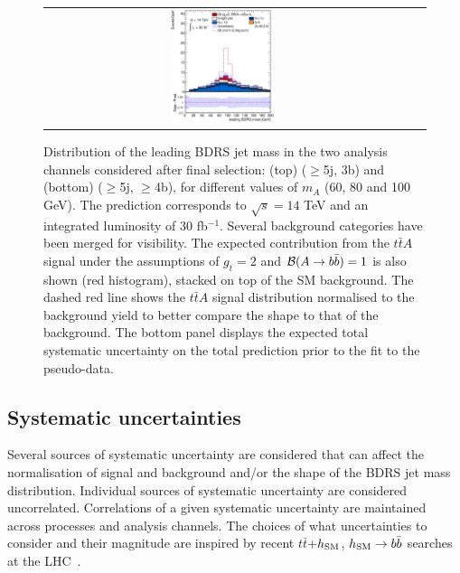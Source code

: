 \documentclass[preprintnumbers,superscriptaddress,nofootinbib,aps,prd,floatfix]{revtex4}
\newcommand{\ttbar}{\ensuremath{t\bar{t}}}
\begin{document}
\begin{figure}[htbp]
\begin{center}
\begin{tabular}{ccc}
\includegraphics[width=0.3\textwidth]{Figures/21stJuly/tta100/VD_2.eps} \\
\end{tabular}
\caption{\small {Distribution of the leading BDRS jet mass in the two analysis channels considered after final selection: 
(top) ($\geq$5j, 3b) and (bottom) ($\geq$5j, $\geq$4b), for different values of $m_A$ (60, 80 and 100 GeV).
The prediction corresponds to $\sqrt{s}=14$ TeV and an integrated luminosity of 30 fb$^{-1}$.
Several background categories have been merged for visibility. The expected contribution from 
the $\ttbar A$ signal under the assumptions of $g_t=2$ and ${\cal B}(A\to b\bar{b})=1$  is also shown
(red histogram), stacked on top of the SM background. The dashed red line shows the $\ttbar A$  signal 
distribution normalised to the background yield to better compare the shape to that of the background.
The bottom panel displays the expected total systematic uncertainty on the total prediction prior to the fit 
to the pseudo-data.}}
\label{fig:mA_2} 
\end{center}
\end{figure}

\subsection{Systematic uncertainties}
\label{sec:systematics}

Several sources of systematic uncertainty are considered that can affect the normalisation of signal 
and background and/or the shape of the BDRS jet mass distribution. 
Individual sources of systematic uncertainty are considered uncorrelated.  Correlations of a given 
systematic uncertainty are maintained across processes and analysis channels. 
The choices of what uncertainties to consider and their magnitude are inspired by recent 
$\ttbar$+$h_{\rm SM}$, $h_{\rm SM}\to b\bar{b}$ searches at the LHC~\cite{Aad:2015gra}.
\end{document}
